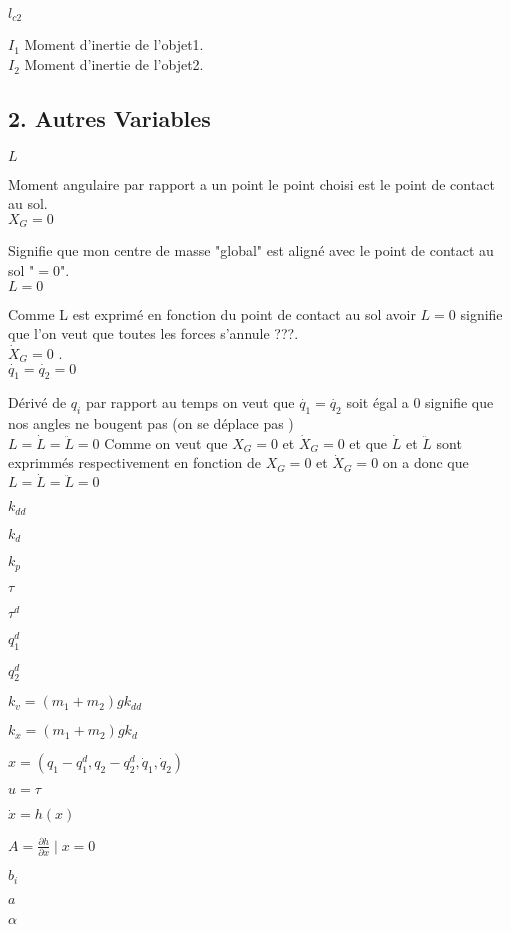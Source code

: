 \documentclass[a4paper,12pt]{report}
\begin{document}
$	l_{c2} $


$	I_{1} $
Moment d'inertie de l'objet1.\\


$	I_{2} $
Moment d'inertie de l'objet2.\\



\subsection*{2. Autres Variables}
\label{sub:Autres Variables}


$	L $

Moment angulaire par rapport a un point le point choisi est le point de contact au sol.\\


$	X_{G} = 0 $

Signifie que mon centre de masse "global" est aligné avec le point de contact au sol "$=0$".\\


$	L = 0 $

Comme L est exprimé en fonction du point de contact au sol avoir $	L = 0 $ signifie que l'on veut que toutes les forces s'annule ???.\\


$	\dot{X}_{G} = 0 $
.\\


$	\dot{q_{1}} = \dot{q_{2}} = 0 $

Dérivé de $q_{i}$ par rapport au temps on veut que $	\dot{q_{1}} = \dot{q_{2}} $ soit égal a $0$ signifie que nos angles ne bougent pas (on se déplace pas )\\



$	L = \dot{L} = \ddot{L} = 0 $
Comme on veut que $	X_{G} = 0 $ et  $	\dot{X}_{G} = 0 $ et que $ \dot{L}$ et $\ddot{L}$ sont exprimmés respectivement en fonction de $	X_{G} = 0 $ et  $	\dot{X}_{G} = 0 $ on a donc que $	L = \dot{L} = \ddot{L} = 0 $



$	k_{dd} $

$	k_{d} $

$	k_{p} $

$	\tau $

$	\tau^{d} $

$	q_{1}^{d} $

$	q_{2}^{d} $

$	k_{v} = ( m_{1} + m_{2})g k_{dd} $

$	k_{x} = ( m_{1} + m_{2})g k_{d} $

$	x = (q_{1} - q_{1}^{d}, q_{2} - q_{2}^{d}, \dot{q}_{1}, \dot{q}_{2}) $

$	 u = \tau $

$	\dot{x} = h(x) $

$	A = \frac{\partial h}{\partial x} \mid x = 0 $

$	b_{i} $

$	a $

$	\alpha $
\end{document}
